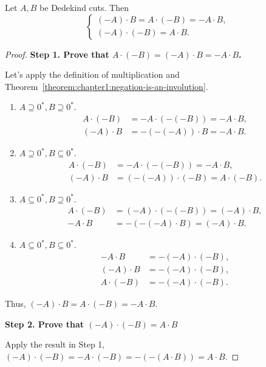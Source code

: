 \begin{theorem}\label{theorem:chapter1:multiplication-and-negation}
    Let $A, B$ be Dedekind cuts. Then
    \[
        \begin{cases}
            (-A)\cdot B = A\cdot (-B) = - A\cdot B, \\
            (-A)\cdot (-B) = A\cdot B.
        \end{cases}
    \]
\end{theorem}

\begin{proof}
    \noindent\textbf{Step 1. Prove that $A\cdot (-B) = (-A)\cdot B = -A\cdot B$.}

    Let's apply the definition of multiplication and Theorem~\ref{theorem:chapter1:negation-is-an-involution}.

    \begin{enumerate}[label={\textbf{Case \arabic*.}},itemsep=0pt,itemindent=0.5cm]
        \item $A\supseteq {0}^{*}, B\supseteq {0}^{*}$.
              \begin{align*}
                  A\cdot (-B) & = -A\cdot (-(-B)) = -A\cdot B, \\
                  (-A)\cdot B & = -(-(-A))\cdot B = -A\cdot B.
              \end{align*}
        \item $A\supseteq {0}^{*}, B\subseteq {0}^{*}$.
              \begin{align*}
                  A\cdot (-B) & = -A\cdot (-(-B)) = -A\cdot B, \\
                  (-A)\cdot B & = (-(-A))\cdot (-B) = A\cdot (-B).
              \end{align*}
        \item $A\subseteq {0}^{*}, B\supseteq {0}^{*}$.
              \begin{align*}
                  A\cdot (-B) & = (-A)\cdot (-(-B)) = (-A)\cdot B, \\
                  -A\cdot B & = -(-(-A)\cdot B) = (-A)\cdot B.
              \end{align*}
        \item $A\subseteq {0}^{*}, B\subseteq {0}^{*}$.
              \begin{align*}
                  -A\cdot B & = -(-A)\cdot (-B), \\
                  (-A)\cdot B & = -(-A)\cdot (-B), \\
                  A\cdot (-B) & = -(-A)\cdot (-B).
              \end{align*}
    \end{enumerate}

    Thus, $(-A)\cdot B = A\cdot (-B) = -A\cdot B$.

    \noindent\textbf{Step 2. Prove that $(-A)\cdot (-B) = A\cdot B$}

    \noindent Apply the result in Step 1, $(-A)\cdot (-B) = -A\cdot (-B) = -(-(A\cdot B)) = A\cdot B$.
\end{proof}

